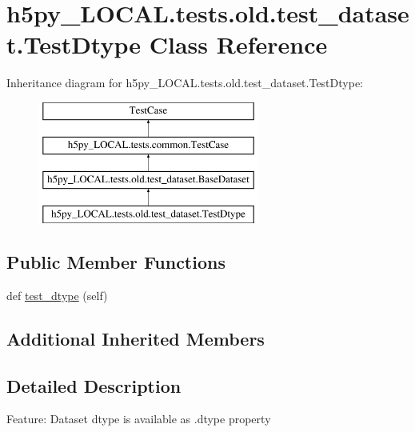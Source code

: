 \hypertarget{classh5py__LOCAL_1_1tests_1_1old_1_1test__dataset_1_1TestDtype}{}\section{h5py\+\_\+\+L\+O\+C\+A\+L.\+tests.\+old.\+test\+\_\+dataset.\+Test\+Dtype Class Reference}
\label{classh5py__LOCAL_1_1tests_1_1old_1_1test__dataset_1_1TestDtype}
Inheritance diagram for h5py\+\_\+\+L\+O\+C\+A\+L.\+tests.\+old.\+test\+\_\+dataset.\+Test\+Dtype\+:\begin{figure}[H]
\begin{center}
\leavevmode
\includegraphics[height=4.000000cm]{classh5py__LOCAL_1_1tests_1_1old_1_1test__dataset_1_1TestDtype}
\end{center}
\end{figure}
\subsection*{Public Member Functions}
\begin{DoxyCompactItemize}
\item 
def \hyperlink{classh5py__LOCAL_1_1tests_1_1old_1_1test__dataset_1_1TestDtype_ac3aa075476eb46d900f6f8da0065e683}{test\+\_\+dtype} (self)
\end{DoxyCompactItemize}
\subsection*{Additional Inherited Members}


\subsection{Detailed Description}
\begin{DoxyVerb}    Feature: Dataset dtype is available as .dtype property
\end{DoxyVerb}
 

